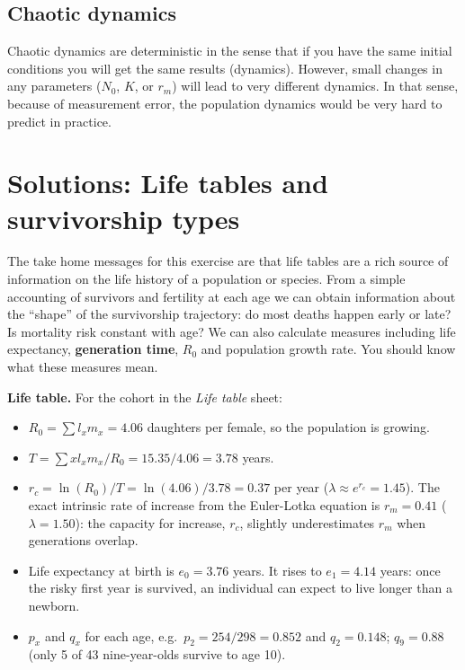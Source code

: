 \documentclass[
  a4paper]{book}
\providecommand{\tightlist}{%
  \setlength{\itemsep}{0pt}\setlength{\parskip}{0pt}}
\begin{document}
\subsection{Chaotic dynamics}\label{chaotic-dynamics}

Chaotic dynamics are deterministic in the sense that if you have the same initial conditions you will get the same results (dynamics). However, small changes in any parameters (\(N_0\), \(K\), or \(r_m\)) will lead to very different dynamics. In that sense, because of measurement error, the population dynamics would be very hard to predict in practice.

\section{Solutions: Life tables and survivorship types}\label{solutions-life-tables-and-survivorship-types}

The take home messages for this exercise are that life tables are a rich source of information on the life history of a population or species. From a simple accounting of survivors and fertility at each age we can obtain information about the ``shape'' of the survivorship trajectory: do most deaths happen early or late? Is mortality risk constant with age? We can also calculate measures including life expectancy, \textbf{generation time}, \(R_0\) and population growth rate. You should know what these measures mean.

\textbf{Life table.} For the cohort in the \emph{Life table} sheet:

\begin{itemize}
\tightlist
\item
  \(R_0 = \sum l_x m_x = 4.06\) daughters per female, so the population is growing.
\item
  \(T = \sum x l_x m_x / R_0 = 15.35/4.06 = 3.78\) years.
\item
  \(r_c = \ln(R_0)/T = \ln(4.06)/3.78 = 0.37\) per year (\(\lambda \approx e^{r_c} = 1.45\)). The exact intrinsic rate of increase from the Euler-Lotka equation is \(r_m = 0.41\) (\(\lambda = 1.50\)): the capacity for increase, \(r_c\), slightly underestimates \(r_m\) when generations overlap.
\item
  Life expectancy at birth is \(e_0 = 3.76\) years. It rises to \(e_1 = 4.14\) years: once the risky first year is survived, an individual can expect to live longer than a newborn.
\item
  \(p_x\) and \(q_x\) for each age, e.g.~\(p_2 = 254/298 = 0.852\) and \(q_2 = 0.148\); \(q_9 = 0.88\) (only 5 of 43 nine-year-olds survive to age 10).
\end{itemize}
\end{document}
